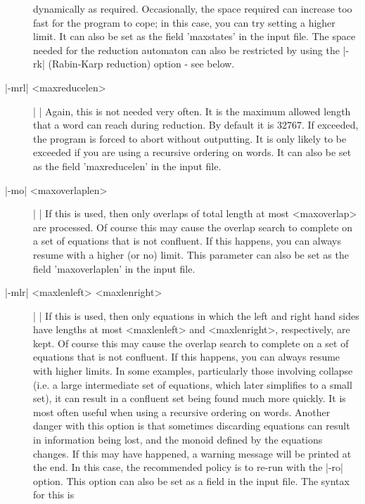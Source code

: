 \begin{description}
dynamically as required. Occasionally, the space required can increase too fast
for the program to cope; in this case, you can try setting a higher limit.
It can also be set as the field 'maxstates' in the input file.
The space needed for the reduction automaton can also be restricted by
using the |-rk| (Rabin-Karp reduction) option - see below.
\item[|-mrl| <maxreducelen>] | |\newline
Again, this is not needed very often. It is the maximum allowed length that
a word can reach during reduction. By default it is 32767.
If exceeded, the program is forced to abort without outputting.
It is only likely to be exceeded if you are using a recursive ordering on words.
It can also be set as the field 'maxreducelen' in the input file.
\item[|-mo| <maxoverlaplen>] | |\newline
If this is used, then only overlaps of total length at most <maxoverlap>
are processed.
Of course this may cause the overlap search to complete on a set
of equations that is not confluent. If this happens, you can always resume
with a higher (or no) limit.
This parameter can also be set as the field 'maxoverlaplen' in the input file.
\item[|-mlr| <maxlenleft> <maxlenright>] | |\newline
If this is used, then only equations in which the left and right hand sides
have lengths at most <maxlenleft> and <maxlenright>, respectively, are
kept. Of course this may cause the overlap search to complete on a set
of equations that is not confluent. If this happens, you can always resume
with higher limits. In some examples, particularly those involving
collapse (i.e. a large intermediate set of equations, which later simplifies
to a small set), it can result in a confluent set being found much more
quickly. It is most often useful when using a recursive ordering on words. 
Another danger with this option is that sometimes discarding equations can
result in information being lost, and the monoid defined by the equations
changes. If this may have happened, a warning message will be printed at
the end. In this case, the recommended policy is to re-run with the
|-ro| option. This option can also be set as a field in the input file.
The syntax for this is


\end{description}

